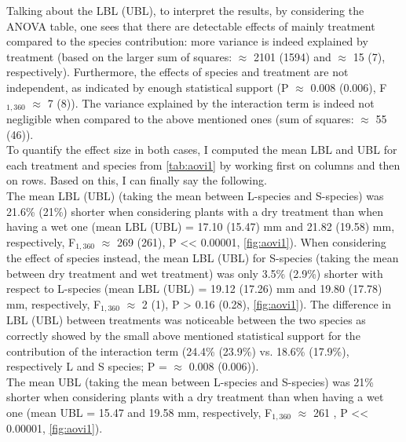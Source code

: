 \documentclass{article}
\begin{document}
Talking about the LBL (UBL), to interpret the results, by considering the ANOVA table, one sees that there are detectable effects of mainly treatment compared to the species contribution: more variance is indeed explained by treatment (based on the larger sum of squares: $\approx$ 2101 (1594) and $\approx$ 15 (7), respectively). Furthermore, the effects of species and treatment are not independent, as indicated by enough statistical support (P $\approx$ 0.008 (0.006), F$_{1,360}$ $\approx$ 7 (8)). The variance explained by the interaction term is indeed not negligible when compared to the above mentioned ones (sum of squares: $\approx$ 55 (46)).\\

To quantify the effect size in both cases, I computed the mean LBL and UBL for each treatment and species from \autoref{tab:aovi1} by working first on columns and then on rows. Based on this, I can finally say the following.\\
The mean LBL (UBL) (taking the mean between L-species and S-species) was 21.6\% (21\%) shorter when considering plants with a dry treatment than when having a wet one (mean LBL (UBL) = 17.10 (15.47) mm and 21.82 (19.58) mm, respectively, F$_{1,360}$ $\approx$ 269 (261), P << 0.00001, \autoref{fig:aovi1}).
When considering the effect of species instead, the mean LBL (UBL) for S-species (taking the mean between dry treatment and wet treatment) was only 3.5\% (2.9\%) shorter with respect to L-species (mean LBL (UBL) = 19.12 (17.26) mm and 19.80 (17.78) mm, respectively, F$_{1,360}$ $\approx$ 2 (1), P > 0.16 (0.28), \autoref{fig:aovi1}).
The difference in LBL (UBL) between treatments was noticeable between the two species as correctly showed by the small above mentioned statistical support for the contribution of the interaction term (24.4\% (23.9\%) vs. 18.6\% (17.9\%), respectively L and S species; P = $\approx$ 0.008 (0.006)).\\
\iffalse
The mean UBL (taking the mean between L-species and S-species) was 21\% shorter when considering plants with a dry treatment than when having a wet one (mean UBL = 15.47 and 19.58 mm, respectively, F$_{1,360}$ $\approx$ 261 , P << 0.00001, \autoref{fig:aovi1}).
\end{document}
